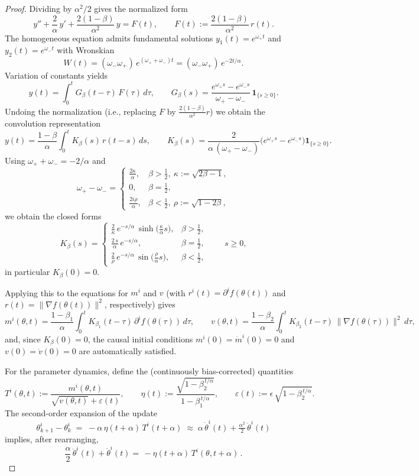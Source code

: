 \documentclass{article} %
\begin{document}
\begin{proof}
Dividing by $\alpha^2/2$ gives the normalized form
\[
y''+\frac{2}{\alpha}\,y'+\frac{2(1-\beta)}{\alpha^2}\,y
=F(t),\qquad F(t):=\frac{2(1-\beta)}{\alpha^2}\,r(t).
\]
The homogeneous equation admits fundamental solutions $y_1(t)=e^{\omega_+ t}$ and $y_2(t)=e^{\omega_- t}$ with Wronskian
\[
W(t)=(\omega_-\omega_+)\,e^{(\omega_++\omega_-)t}=(\omega_-\omega_+)\,e^{-2t/\alpha}.
\]
Variation of constants yields
\[
y(t)=\int_{0}^{t}G_\beta(t-\tau)\,F(\tau)\,d\tau,\qquad
G_\beta(s)=\frac{e^{\omega_+ s}-e^{\omega_- s}}{\omega_+-\omega_-}\,\mathbf 1_{\{s\ge 0\}}.
\]
Undoing the normalization (i.e., replacing $F$ by $\tfrac{2(1-\beta)}{\alpha^2}r$) we obtain the convolution representation
\[
y(t)=\frac{1-\beta}{\alpha}\int_{0}^{t}K_\beta(s)\,r(t-s)\,ds,\qquad
K_\beta(s)=\frac{2}{\alpha\,(\omega_+-\omega_-)}\Big(e^{\omega_+ s}-e^{\omega_- s}\Big)\mathbf 1_{\{s\ge 0\}}.
\]
Using $\omega_++\omega_-=-2/\alpha$ and
\[
\omega_+-\omega_-=
\begin{cases}
\frac{2\kappa}{\alpha}, & \beta>\tfrac12,\ \kappa:=\sqrt{2\beta-1},\\[2pt]
0, & \beta=\tfrac12,\\[2pt]
\frac{2i\rho}{\alpha}, & \beta<\tfrac12,\ \rho:=\sqrt{1-2\beta},
\end{cases}
\]
we obtain the closed forms
\[
K_\beta(s)=
\begin{cases}
\displaystyle \frac{2}{\kappa}\,e^{-s/\alpha}\,\sinh\!\Big(\frac{\kappa}{\alpha}s\Big), & \beta>\tfrac12,\\[8pt]
\displaystyle \frac{2\,s}{\alpha}\,e^{-s/\alpha}, & \beta=\tfrac12,\\[6pt]
\displaystyle \frac{2}{\rho}\,e^{-s/\alpha}\,\sin\!\Big(\frac{\rho}{\alpha}s\Big), & \beta<\tfrac12,
\end{cases}
\qquad s\ge 0,
\]
in particular $K_\beta(0)=0$.

Applying this to the equations for $m^i$ and $v$ (with $r^i(t)=\partial^i f(\theta(t))$ and $r(t)=\|\nabla f(\theta(t))\|^2$, respectively) gives
\[
m^i(\theta, t)=\frac{1-\beta_1}{\alpha}\int_{0}^{t}K_{\beta_1}(t-\tau)\,\partial^i f(\theta(\tau))\,d\tau,
\qquad
v(\theta, t)=\frac{1-\beta_2}{\alpha}\int_{0}^{t}K_{\beta_2}(t-\tau)\,\|\nabla f(\theta(\tau))\|^2\,d\tau,
\]
and, since $K_\beta(0)=0$, the causal initial conditions $m^i(0)=\dot m^i(0)=0$ and $v(0)=\dot v(0)=0$ are automatically satisfied.

For the parameter dynamics, define the (continuously bias-corrected) quantities
\[
T^i(\theta,t):=\frac{m^i(\theta,t)}{\sqrt{v(\theta,t)}+\varepsilon(t)},\qquad
\eta(t):=\frac{\sqrt{1-\beta_2^{\,t/\alpha}}}{1-\beta_1^{\,t/\alpha}},\qquad
\varepsilon(t):=\epsilon\,\sqrt{1-\beta_2^{\,t/\alpha}}.
\]
The second-order expansion of the update
\[
\theta^i_{k+1}- \theta^i_{k} \;=\;-\alpha\,\eta(t+\alpha)\,T^i(t+\alpha)
\;\approx\;\alpha\,\dot\theta^i(t)+\tfrac{\alpha^2}{2}\,\ddot\theta^i(t)
\]
implies, after rearranging,
\[
\frac{\alpha}{2}\,\ddot\theta^i(t)+\dot\theta^i(t)=\,-\eta(t+\alpha)\,T^i(\theta,t+\alpha)\,.
\]
\end{proof}
\end{document}
